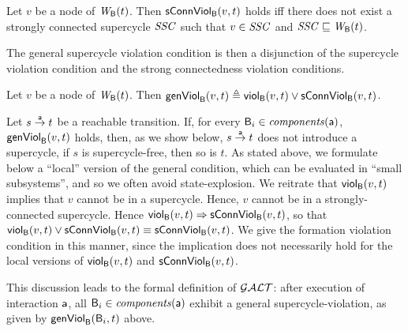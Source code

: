 \begin{definition}
\label{def:sConn.violation}
 Let $v$ be a node of $\wfg{\B}{t}$.   Then $\connViol{v}{t}$ holds iff there does not exist a 
strongly connected supercycle $\SSC$ such that $v \in \SSC$ and $\SSC \subg \wfg{\B}{t}$.
\end{definition}



The general supercycle violation condition is then a disjunction of the supercycle violation condition
and the strong connectedness violation conditions.


\begin{definition}
\label{def:formation.violation} 
\label{defn:formation.violation} 
Let $v$ be a node of $\wfg{\B}{t}$.
Then 
$\genViol{v}{t}  \df \scV{v}{t}  \lor \connViol{v}{t}$.
\end{definition}
%
Let $s \goesto[\act] t$ be a reachable transition. If, for every $\B_i \in \cmps{\act}$, $\formViol{v}{t}$ holds, then, as we show below,
$s \goesto[\act] t$ does not introduce a supercycle, \ie if $s$ is supercycle-free, then so is $t$. As stated above, we formulate below a ``local''
version of the general condition, which can be evaluated in ``small subsystems'', and so we often avoid state-explosion.
%
%
We reitrate that $\scV{v}{t}$ implies that $v$ cannot be in a supercycle. Hence, $v$ cannot be in a strongly-connected supercycle.
Hence $\scV{v}{t} \imp \connViol{v}{t}$, so that 
$\scV{v}{t}  \lor \connViol{v}{t} \ev  \connViol{v}{t}$.
We give the formation violation condition in this manner, since 
the implication does not necessarily hold for the local versions of $\scV{v}{t}$ and $\connViol{v}{t}$.

This discussion leads to the formal definition of $\GAO$: 
after execution of interaction $\act$, all $\B_i \in \cmps{\act}$ exhibit a general supercycle-violation, as given by $\genViol{\B_i}{t}$ above.

